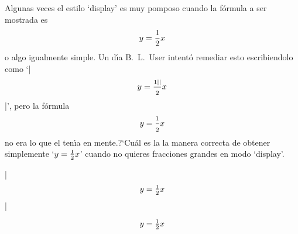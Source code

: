 

\bigskip

\enunciadoS Algunas veces el estilo `display' es muy pomposo cuando la
f\'ormula a ser mostrada es
$$y={1\over2}x$$
\noindent o algo igualmente simple. Un d\'{\i}a B.~L.~User intentó
remediar esto escribiendolo como `|$$y={\scriptstyle1|
|\over\scriptstyle2}x$$|', pero la f\'ormula
$$y={\scriptstyle1\over\scriptstyle2}x$$
\noindent no era lo que el ten\'{\i}a en mente.?`Cu\'al es la la
manera correcta de obtener simplemente `$y={1\over2}x$' cuando no
quieres fracciones grandes en modo `display'.

\bigskip

\respuestaS

|$$\textstyle y={1\over2}x$$|

$$\textstyle y={1\over2}x$$

\bye


